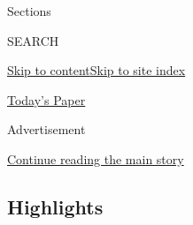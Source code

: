Sections

SEARCH

\protect\hyperlink{site-content}{Skip to
content}\protect\hyperlink{site-index}{Skip to site index}

\href{https://myaccount.nytimes3xbfgragh.onion/auth/login?response_type=cookie\&client_id=vi}{}

\href{https://www.nytimes3xbfgragh.onion/section/todayspaper}{Today's
Paper}

Advertisement

\protect\hyperlink{after-top}{Continue reading the main story}

\hypertarget{highlights}{%
\subsection{Highlights}\label{highlights}}

